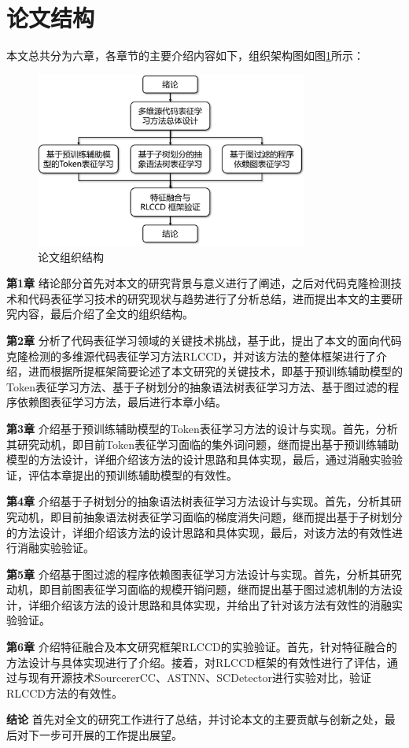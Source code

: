 \section{论文结构}
\label{sec:Summary1}
本文总共分为六章，各章节的主要介绍内容如下，组织架构图如图\ref{fig:Structure}所示：

\begin{figure}[H]
    \centering
    \includegraphics[width=0.8\textwidth]{figures/Structure}
    \caption{论文组织结构}\label{fig:Structure}
\end{figure}

\textbf{第1章} \quad 绪论部分首先对本文的研究背景与意义进行了阐述，之后对代码克隆检测技术和代码表征学习技术的研究现状与趋势进行了分析总结，进而提出本文的主要研究内容，最后介绍了全文的组织结构。

\textbf{第2章}  \quad 分析了代码表征学习领域的关键技术挑战，基于此，提出了本文的面向代码克隆检测的多维源代码表征学习方法RLCCD，并对该方法的整体框架进行了介绍，进而根据所提框架简要论述了本文研究的关键技术，即基于预训练辅助模型的Token表征学习方法、基于子树划分的抽象语法树表征学习方法、基于图过滤的程序依赖图表征学习方法，最后进行本章小结。

\textbf{第3章}  \quad 介绍基于预训练辅助模型的Token表征学习方法的设计与实现。首先，分析其研究动机，即目前Token表征学习面临的集外词问题，继而提出基于预训练辅助模型的方法设计，详细介绍该方法的设计思路和具体实现，最后，通过消融实验验证，评估本章提出的预训练辅助模型的有效性。

\textbf{第4章}  \quad 介绍基于子树划分的抽象语法树表征学习方法设计与实现。首先，分析其研究动机，即目前抽象语法树表征学习面临的梯度消失问题，继而提出基于子树划分的方法设计，详细介绍该方法的设计思路和具体实现，最后，对该方法的有效性进行消融实验验证。

\textbf{第5章}  \quad 介绍基于图过滤的程序依赖图表征学习方法设计与实现。首先，分析其研究动机，即目前图表征学习面临的规模开销问题，继而提出基于图过滤机制的方法设计，详细介绍该方法的设计思路和具体实现，并给出了针对该方法有效性的消融实验验证。

\textbf{第6章}  \quad 介绍特征融合及本文研究框架RLCCD的实验验证。首先，针对特征融合的方法设计与具体实现进行了介绍。接着，对RLCCD框架的有效性进行了评估，通过与现有开源技术SourcererCC\cite{7886988}、ASTNN\cite{8812062}、SCDetector\cite{10.1145/3324884.3416562}进行实验对比，验证RLCCD方法的有效性。

\textbf{结论}  \quad 首先对全文的研究工作进行了总结，并讨论本文的主要贡献与创新之处，最后对下一步可开展的工作提出展望。